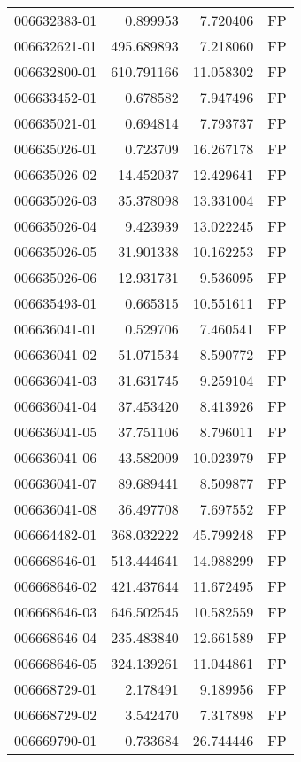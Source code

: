 \begin{tabular}{lrrl}
006632383-01 &    0.899953 &     7.720406 &   FP \\
006632621-01 &  495.689893 &     7.218060 &   FP \\
006632800-01 &  610.791166 &    11.058302 &   FP \\
006633452-01 &    0.678582 &     7.947496 &   FP \\
006635021-01 &    0.694814 &     7.793737 &   FP \\
006635026-01 &    0.723709 &    16.267178 &   FP \\
006635026-02 &   14.452037 &    12.429641 &   FP \\
006635026-03 &   35.378098 &    13.331004 &   FP \\
006635026-04 &    9.423939 &    13.022245 &   FP \\
006635026-05 &   31.901338 &    10.162253 &   FP \\
006635026-06 &   12.931731 &     9.536095 &   FP \\
006635493-01 &    0.665315 &    10.551611 &   FP \\
006636041-01 &    0.529706 &     7.460541 &   FP \\
006636041-02 &   51.071534 &     8.590772 &   FP \\
006636041-03 &   31.631745 &     9.259104 &   FP \\
006636041-04 &   37.453420 &     8.413926 &   FP \\
006636041-05 &   37.751106 &     8.796011 &   FP \\
006636041-06 &   43.582009 &    10.023979 &   FP \\
006636041-07 &   89.689441 &     8.509877 &   FP \\
006636041-08 &   36.497708 &     7.697552 &   FP \\
006664482-01 &  368.032222 &    45.799248 &   FP \\
006668646-01 &  513.444641 &    14.988299 &   FP \\
006668646-02 &  421.437644 &    11.672495 &   FP \\
006668646-03 &  646.502545 &    10.582559 &   FP \\
006668646-04 &  235.483840 &    12.661589 &   FP \\
006668646-05 &  324.139261 &    11.044861 &   FP \\
006668729-01 &    2.178491 &     9.189956 &   FP \\
006668729-02 &    3.542470 &     7.317898 &   FP \\
006669790-01 &    0.733684 &    26.744446 &   FP \\

\end{tabular}
